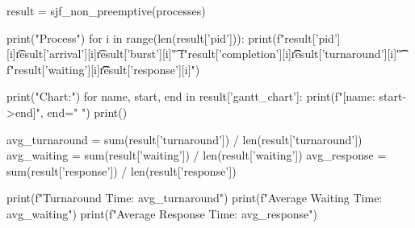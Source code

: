 result = sjf_non_preemptive(processes)

print("Process\tArrival\tBurst\tCompletion\tTurnaround\tWaiting\tResponse")
for i in range(len(result['pid'])):
    print(f"{result['pid'][i]}\t{result['arrival'][i]}\t{result['burst'][i]}\t"
          f"{result['completion'][i]}\t\t{result['turnaround'][i]}\t\t"
          f"{result['waiting'][i]}\t\t{result['response'][i]}")

print("\nGantt Chart:")
for name, start, end in result['gantt_chart']:
    print(f"[{name}: {start}->{end}]", end=" ")
print()

avg_turnaround = sum(result['turnaround']) / len(result['turnaround'])
avg_waiting = sum(result['waiting']) / len(result['waiting'])
avg_response = sum(result['response']) / len(result['response'])

print(f"\nAverage Turnaround Time: {avg_turnaround}")
print(f"Average Waiting Time: {avg_waiting}")
print(f"Average Response Time: {avg_response}")
